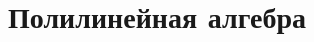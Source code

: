 \documentclass{scrartcl}
\begin{document}
    \setcounter{section}{13}
    
    
    \setcounter{section}{27}
        
    \part{Полилинейная алгебра}
\end{document}
